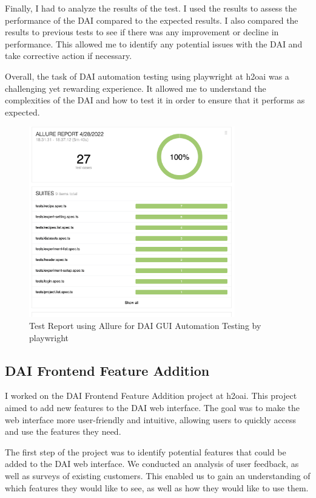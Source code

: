 \documentclass[12pt,a4paper]{report}
\begin{document}
Finally, I had to analyze the results of the test. I used the results to assess the performance of the \ac{DAI} compared to the expected results. I also compared the results to previous tests to see if there was any improvement or decline in performance. This allowed me to identify any potential issues with the \ac{DAI} and take corrective action if necessary.

Overall, the task of \ac{DAI} automation testing using playwright at h2oai was a challenging yet rewarding experience. It allowed me to understand the complexities of the \ac{DAI} and how to test it in order to ensure that it performs as expected.

\begin{figure}[H]
\centering
\includegraphics[width=0.8\textwidth]{testReport.png}
\caption{Test Report using Allure for \ac{DAI} GUI Automation Testing by playwright}
\end{figure}

\subsection{ \ac{DAI} Frontend Feature Addition}

I worked on the \ac{DAI} Frontend Feature Addition project at h2oai. This project aimed to add new features to the \ac{DAI} web interface. The goal was to make the web interface more user-friendly and intuitive, allowing users to quickly access and use the features they need.

The first step of the project was to identify potential features that could be added to the \ac{DAI} web interface. We conducted an analysis of user feedback, as well as surveys of existing customers. This enabled us to gain an understanding of which features they would like to see, as well as how they would like to use them.
\end{document}
